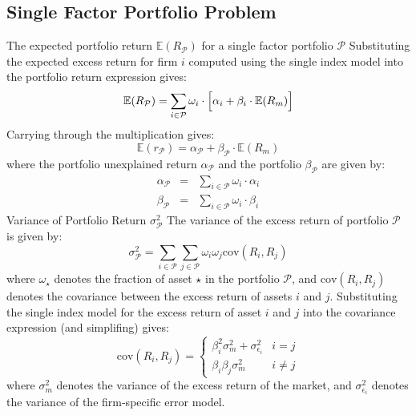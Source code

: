 \documentclass[11pt]{article}
\theoremstyle{definition}
\begin{document}
\subsection{Single Factor Portfolio Problem}\label{subsec:single-factor-model-portfolios}
The expected portfolio return $\mathbb{E}(R_{\mathcal{P}})$ for a single factor portfolio $\mathcal{P}$
Substituting the expected excess return for firm $i$ computed using the single index model into the portfolio return expression gives:
\begin{equation*}
\mathbb{E}(R_{\mathcal{P}}) = \sum_{i\in\mathcal{P}}\omega_{i}\cdot\Bigl[\alpha_{i}+\beta_{i}\cdot\mathbb{E}(R_{m})\Bigr]
\end{equation*}
Carrying through the multiplication gives:
\begin{equation*}
\mathbb{E}(r_{\mathcal{P}}) = \alpha_{\mathcal{P}}+\beta_{\mathcal{P}}\cdot\mathbb{E}(R_{m})
\end{equation*}
where the portfolio unexplained return $\alpha_{\mathcal{P}}$ and the portfolio $\beta_{\mathcal{P}}$ are given by:
\begin{eqnarray*}
    \alpha_{\mathcal{P}} & = & \sum_{i\in\mathcal{P}}\omega_{i}\cdot\alpha_{i}\\
    \beta_{\mathcal{P}} & = & \sum_{i\in\mathcal{P}}\omega_{i}\cdot\beta_{i}
\end{eqnarray*}
Variance of Portfolio Return $\sigma_{\mathcal{P}}^2$
The variance of the excess return of portfolio $\mathcal{P}$ is given by:
\begin{equation*}
\sigma_{\mathcal{P}}^2 = 
\sum_{i\in\mathcal{P}}\sum_{j\in\mathcal{P}}\omega_{i}\omega_{j}
\text{cov}\left(R_{i},R_{j}\right)
\end{equation*}
where $\omega_{\star}$ denotes the fraction of asset $\star$ in the portfolio $\mathcal{P}$, and 
$\text{cov}\left(R_{i},R_{j}\right)$ denotes the covariance between the excess return of assets $i$ and $j$. 
Substituting the single index model for the excess return of asset $i$ and $j$ into the covariance expression 
(and simplifing) gives:
\begin{equation*}
\text{cov}(R_{i}, R_{j}) = \begin{cases}
\beta_{i}^{2}\sigma_{m}^{2}+\sigma_{\epsilon_{i}}^{2} & i = j \\
\beta_{i}\beta_{j}\sigma_{m}^2 & i \neq j
\end{cases}
\end{equation*}
where $\sigma_{m}^2$ denotes the variance of the excess return of the market, 
and $\sigma_{\epsilon_{i}}^{2}$ denotes the variance of the firm-specific error model.
\end{document}
